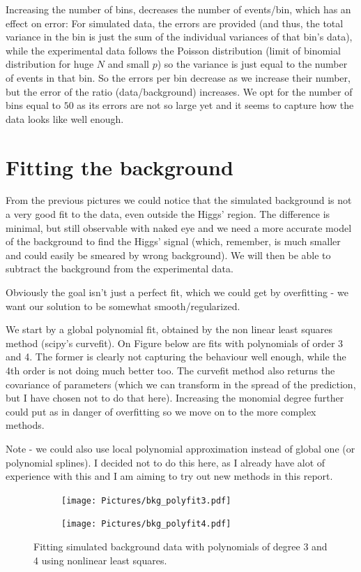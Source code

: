 \documentclass{article}
\begin{document}
Increasing the number of bins, decreases the number of events/bin, which has an effect on error: For simulated data, the errors are provided (and thus, the total variance in the bin is just the sum of the individual variances of that bin's data), while the experimental data follows the Poisson distribution (limit of binomial distribution for huge $N$ and small $p$) so the variance is just equal to the number of events in that bin.
So the errors per bin decrease as we increase their number, but the error of the ratio (data/background) increases. We opt for the number of bins equal to $50$ as its errors are not so large yet and it seems to capture how the data looks like well enough.

\section*{Fitting the background}
From the previous pictures we could notice that the simulated background is not a very good fit to the data, even outside the Higgs' region. The difference is minimal, but still observable with naked eye and we need a more accurate model of the background to find the Higgs' signal (which, remember, is much smaller and could easily be smeared by wrong background). We will then be able to subtract the background from the experimental data.

Obviously the goal isn't just a perfect fit, which we could get by overfitting - we want our solution to be somewhat smooth/regularized.

We start by a global polynomial fit, obtained by the non linear least squares method (scipy's curvefit). On Figure below are fits with polynomials of order 3 and 4. The former is clearly not capturing the behaviour well enough, while the 4th order is not doing much better too. The curvefit method also returns the covariance of parameters (which we can transform in the spread of the prediction, but I have chosen not to do that here). Increasing the monomial degree further could put as in danger of overfitting so we move on to the more complex methods.

Note - we could also use local polynomial approximation instead of global one (or polynomial splines). I decided not to do this here, as I already have alot of experience with this and I am aiming to try out new methods in this report.  

\begin{figure}[H]
\centering
\begin{subfigure}{.49\textwidth}
\texttt{[image: Pictures/bkg\_polyfit3.pdf]}
\end{subfigure}
\begin{subfigure}{.49\textwidth}
\texttt{[image: Pictures/bkg\_polyfit4.pdf]}
\end{subfigure}
\caption*{Fitting simulated background data with polynomials of degree 3 and 4 using nonlinear least squares.}
\label{fig:bkgPolyFit}
\end{figure}
\end{document}
